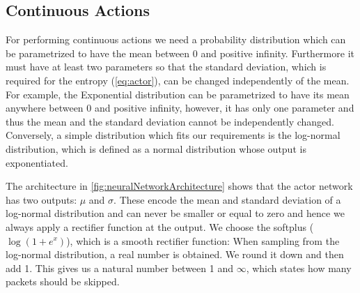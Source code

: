 \documentclass[conference]{IEEEtran}
\newcommand\note[2]{{\color{#1}#2}}
\begin{document}

\subsection{Continuous Actions}

For performing continuous actions we need a probability distribution which can be parametrized to have the mean between 0 and positive infinity. Furthermore it must have at least two parameters so that the standard deviation, which is required for the entropy (\autoref{eq:actor}), can be changed independently of the mean. For example, the Exponential distribution can be parametrized to have its mean anywhere between 0 and positive infinity, however, it has only one parameter and thus the mean and the standard deviation cannot be independently changed. Conversely, a simple distribution which fits our requirements is the log-normal distribution, which is defined as a normal distribution whose output is exponentiated.


The architecture in \autoref{fig:neuralNetworkArchitecture} shows that the actor network has two outputs: $\mu$ and $\sigma$. These encode the mean and standard deviation of a log-normal distribution and can never be smaller or equal to zero and hence we always apply a rectifier function at the output. We choose the softplus ($\log\left(1 + e^x \right)$), which is a smooth rectifier function:
When sampling from the log-normal distribution, a real number is obtained. We round it down and then add 1. This gives us a natural number between 1 and $\infty$, which states how many packets should be skipped. 
\end{document}
